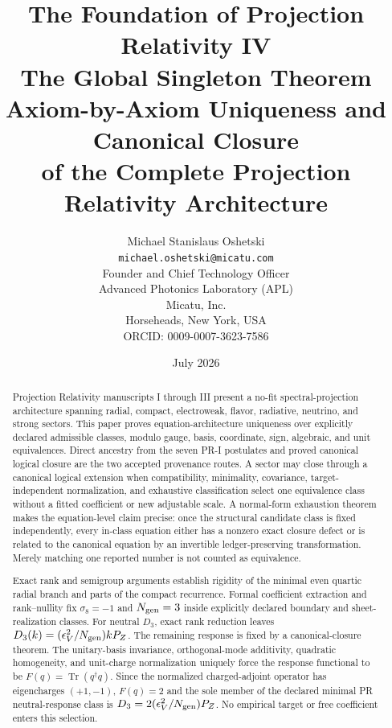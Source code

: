 \documentclass[11pt]{article}
\title{\textbf{The Foundation of Projection Relativity IV}\\[0.35em]
\Large The Global Singleton Theorem\\
\large Axiom-by-Axiom Uniqueness and Canonical Closure\\
\large of the Complete Projection Relativity Architecture}
\author{Michael Stanislaus Oshetski \orcidlink{0009-0007-3623-7586} \\
\small \texttt{michael.oshetski@micatu.com}\\ 
\small Founder and Chief Technology Officer \\
\small Advanced Photonics Laboratory (APL)\\
\small Micatu, Inc. \\
\small Horseheads, New York, USA \\
\small ORCID: 0009-0007-3623-7586}
\date {July 2026}
\begin{document}
\maketitle
\begin{abstract}
Projection Relativity manuscripts I through III present a no-fit spectral-projection architecture spanning radial, compact, electroweak, flavor, radiative, neutrino, and strong sectors.  This paper proves equation-architecture uniqueness over explicitly declared
admissible classes, modulo gauge, basis, coordinate, sign, algebraic, and unit equivalences.  Direct ancestry from the seven PR-I postulates and proved canonical logical closure are the two accepted provenance routes.  A sector may close through a canonical logical extension when compatibility, minimality, covariance, target-independent normalization, and exhaustive classification select one equivalence class
without a fitted coefficient or new adjustable scale. A normal-form exhaustion theorem makes the equation-level claim precise: once the structural candidate class is fixed independently, every in-class equation either has a nonzero exact closure defect or is related to the canonical equation by an invertible ledger-preserving transformation.  Merely matching one reported number is not counted as equivalence.

Exact rank and semigroup arguments establish rigidity of the minimal even quartic radial branch and parts of the compact recurrence.  Formal coefficient extraction and rank--nullity fix $\sigma_8=-1$ and $N_{\rm gen}=3$ inside explicitly declared boundary and sheet-realization classes.  For neutral $D_3$, exact rank reduction leaves $D_3(k)=(\epsilon_V^2/N_{\rm gen})kP_Z$.  The remaining response is fixed by a
canonical-closure theorem.  The unitary-basis invariance, orthogonal-mode additivity, quadratic homogeneity, and unit-charge normalization uniquely force the response functional to be $F(q)=\operatorname{Tr}(q^\dagger q)$.  Since the normalized charged-adjoint operator has eigencharges $(+1,-1)$, $F(q)=2$ and the sole member of the declared minimal PR neutral-response class is $D_3=2(\epsilon_V^2/N_{\rm gen})P_Z$.  No empirical target or free coefficient enters this selection.


\end{abstract}
\end{document}
